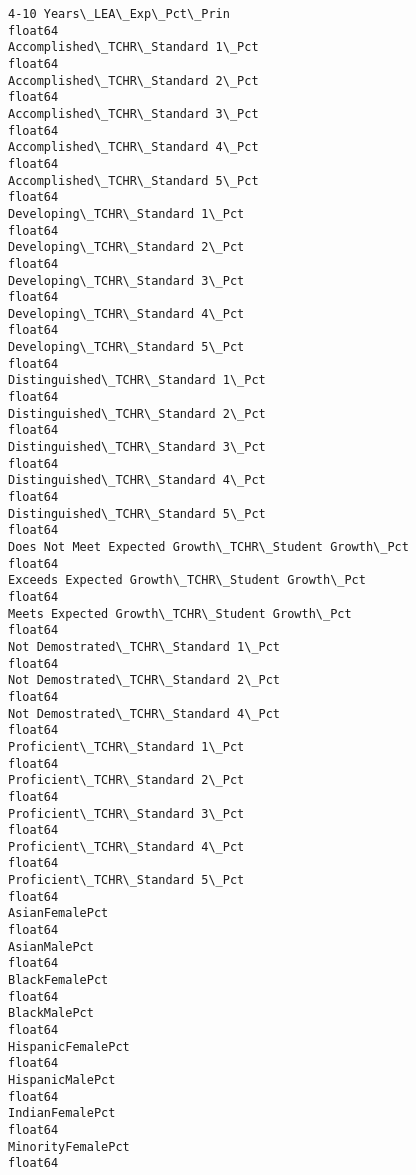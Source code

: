 \documentclass[11pt]{article}
\begin{document}
\begin{Verbatim}[commandchars=\\\{\}]
4-10 Years\_LEA\_Exp\_Pct\_Prin                                     float64
Accomplished\_TCHR\_Standard 1\_Pct                                float64
Accomplished\_TCHR\_Standard 2\_Pct                                float64
Accomplished\_TCHR\_Standard 3\_Pct                                float64
Accomplished\_TCHR\_Standard 4\_Pct                                float64
Accomplished\_TCHR\_Standard 5\_Pct                                float64
Developing\_TCHR\_Standard 1\_Pct                                  float64
Developing\_TCHR\_Standard 2\_Pct                                  float64
Developing\_TCHR\_Standard 3\_Pct                                  float64
Developing\_TCHR\_Standard 4\_Pct                                  float64
Developing\_TCHR\_Standard 5\_Pct                                  float64
Distinguished\_TCHR\_Standard 1\_Pct                               float64
Distinguished\_TCHR\_Standard 2\_Pct                               float64
Distinguished\_TCHR\_Standard 3\_Pct                               float64
Distinguished\_TCHR\_Standard 4\_Pct                               float64
Distinguished\_TCHR\_Standard 5\_Pct                               float64
Does Not Meet Expected Growth\_TCHR\_Student Growth\_Pct           float64
Exceeds Expected Growth\_TCHR\_Student Growth\_Pct                 float64
Meets Expected Growth\_TCHR\_Student Growth\_Pct                   float64
Not Demostrated\_TCHR\_Standard 1\_Pct                             float64
Not Demostrated\_TCHR\_Standard 2\_Pct                             float64
Not Demostrated\_TCHR\_Standard 4\_Pct                             float64
Proficient\_TCHR\_Standard 1\_Pct                                  float64
Proficient\_TCHR\_Standard 2\_Pct                                  float64
Proficient\_TCHR\_Standard 3\_Pct                                  float64
Proficient\_TCHR\_Standard 4\_Pct                                  float64
Proficient\_TCHR\_Standard 5\_Pct                                  float64
AsianFemalePct                                                  float64
AsianMalePct                                                    float64
BlackFemalePct                                                  float64
BlackMalePct                                                    float64
HispanicFemalePct                                               float64
HispanicMalePct                                                 float64
IndianFemalePct                                                 float64
MinorityFemalePct                                               float64

\end{Verbatim}
\end{document}
